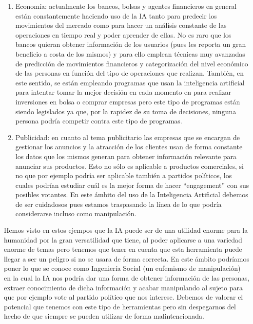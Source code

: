 \begin{enumerate}
  \item Economía: actualmente los bancos, bolsas y agentes financieros en general están constantemente haciendo uso de la IA tanto para predecir los movimientos del mercado como para hacer un análisis constante de las operaciones en tiempo real y poder aprender de ellas. No es raro que los bancos quieran obtener información de los usuarios (pues les reporta un gran beneficio a costa de los mismos) y para ello emplean técnicas muy avanzadas de predicción de movimientos financieros y categorización del nivel económico de las personas en función del tipo de operaciones que realizan. También, en este sentido, se están empleando programas que usan la inteligencia artificial para intentar tomar la mejor decisión en cada momento en para realizar inversiones en bolsa o comprar empresas pero este tipo de programas están siendo legislados ya que, por la rapidez de su toma de decisiones, ninguna persona podría competir contra este tipo de programas.
  \item Publicidad: en cuanto al tema publicitario las empresas que se encargan de gestionar los anuncios y la atracción de los clientes usan de forma constante los datos que los mismos generan para obtener información relevante para anunciar sus productos. Esto no sólo es aplicable a productos comerciales, si no que por ejemplo podría ser aplicable también a partidos políticos, los cuales podrían estudiar cuál es la mejor forma de hacer ``engagement'' con sus posibles votantes. En este ámbito del uso de la Inteligencia Artificial debemos de ser cuidadosos pues estamos traspasando la línea de lo que podría considerarse incluso como manipulación.
\end{enumerate}

Hemos visto en estos ejempos que la IA puede ser de una utilidad enorme para la humanidad por la gran versatilidad que tiene, al poder aplicarse a una variedad enorme de temas pero tenemos que tener en cuenta que esta herramienta puede llegar a ser un peligro si no se usara de forma correcta. En este ámbito podríamos poner lo que se conoce como Ingeniería Social (un eufemismo de manipulación) en la cual la IA nos podría dar una forma de obtener información de las personas, extraer conocimiento de dicha información y acabar manipulando al sujeto para que por ejemplo vote al partido político que nos interese. Debemos de valorar el potencial que tenemos con este tipo de herramientas pero sin despegarnos del hecho de que siempre se pueden utilizar de forma malintencionada.
